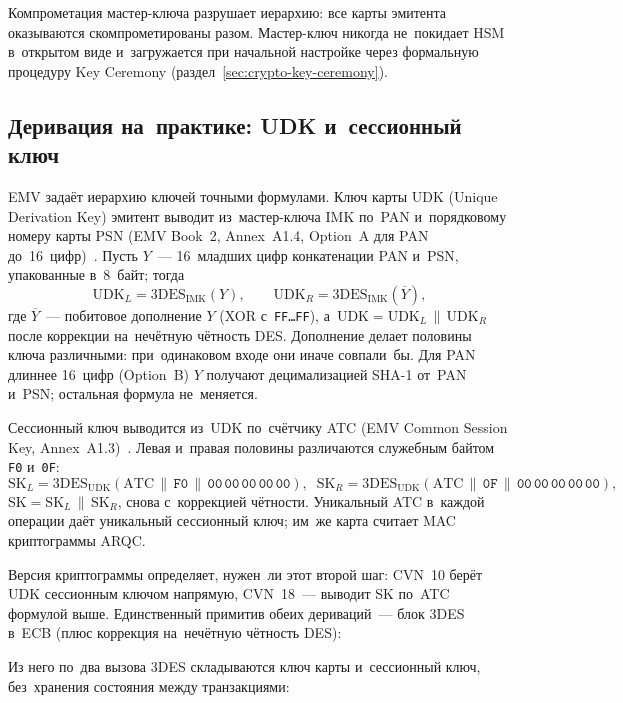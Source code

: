 Компрометация мастер-ключа разрушает иерархию: все карты эмитента оказываются
скомпрометированы разом. Мастер-ключ никогда не~покидает HSM в~открытом виде
и~загружается при начальной настройке через формальную процедуру Key Ceremony
(раздел~\ref{sec:crypto-key-ceremony}).

\FloatBarrier
\subsection*{Деривация на~практике: UDK и~сессионный ключ}\label{sec:crypto-emv-derivation}

EMV задаёт иерархию ключей точными формулами. Ключ карты UDK
(Unique Derivation Key) эмитент выводит из~мастер-ключа IMK по~PAN и~порядковому
номеру карты PSN (EMV Book~2, Annex~A1.4, Option~A для PAN до~16~цифр)~\cite{emvco-book2}.
Пусть $Y$~--- 16~младших цифр конкатенации PAN и~PSN, упакованные в~8~байт; тогда
\[
  \text{UDK}_L = \text{3DES}_{\text{IMK}}(Y), \qquad
  \text{UDK}_R = \text{3DES}_{\text{IMK}}(\overline{Y}),
\]
где $\overline{Y}$~--- побитовое дополнение $Y$ (XOR с~\texttt{FF\dots FF}), а~UDK${} =
\text{UDK}_L \,\|\, \text{UDK}_R$ после коррекции на~нечётную чётность DES. Дополнение
делает половины ключа различными: при~одинаковом входе они иначе совпали~бы. Для
PAN длиннее 16~цифр (Option~B) $Y$ получают децимализацией SHA-1 от~PAN и~PSN;
остальная формула не~меняется.

Сессионный ключ выводится из~UDK по~счётчику ATC (EMV Common Session Key,
Annex~A1.3)~\cite{emvco-book2}. Левая и~правая половины различаются служебным
байтом \texttt{F0} и~\texttt{0F}:
\[
  \text{SK}_L = \text{3DES}_{\text{UDK}}(\text{ATC} \,\|\, \mathtt{F0} \,\|\, \mathtt{00\,00\,00\,00\,00}), \;\;
  \text{SK}_R = \text{3DES}_{\text{UDK}}(\text{ATC} \,\|\, \mathtt{0F} \,\|\, \mathtt{00\,00\,00\,00\,00}),
\]
SK${} = \text{SK}_L \,\|\, \text{SK}_R$, снова с~коррекцией чётности. Уникальный ATC
в~каждой операции даёт уникальный сессионный ключ; им~же карта считает MAC
криптограммы ARQC.

Версия криптограммы определяет, нужен~ли этот второй шаг: CVN~10 берёт UDK сессионным
ключом напрямую, CVN~18~--- выводит SK по~ATC формулой выше. Единственный примитив
обеих дериваций~--- блок
3DES в~ECB (плюс коррекция на~нечётную чётность DES):


Из него по~два вызова 3DES складываются ключ карты и~сессионный ключ, без~хранения
состояния между транзакциями:

